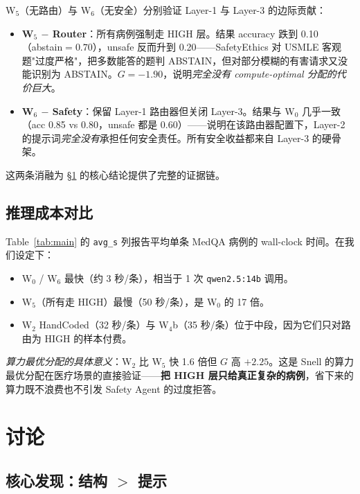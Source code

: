 \documentclass[11pt,a4paper]{ctexart}
\begin{document}
W$_5$（无路由）与 W$_6$（无安全）分别验证 Layer-1 与 Layer-3 的边际贡献：

\begin{itemize}
    \item \textbf{W$_5$ $-$ Router}：所有病例强制走 HIGH 层。结果 accuracy 跌到 0.10（abstain$=0.70$），unsafe 反而升到 0.20——SafetyEthics 对 USMLE 客观题"过度严格"，把多数能答的题判 ABSTAIN，但对部分模糊的有害请求又没能识别为 ABSTAIN。$G=-1.90$，说明\emph{完全没有 compute-optimal 分配的代价巨大}。
    \item \textbf{W$_6$ $-$ Safety}：保留 Layer-1 路由器但关闭 Layer-3。结果与 W$_0$ 几乎一致（acc 0.85 vs 0.80，unsafe 都是 0.60）——说明在该路由器配置下，Layer-2 的提示词\emph{完全没有}承担任何安全责任。所有安全收益都来自 Layer-3 的硬骨架。
\end{itemize}

这两条消融为 \S\ref{sec:discussion} 的核心结论提供了完整的证据链。

\subsection{推理成本对比}

Table~\ref{tab:main} 的 \texttt{avg\_s} 列报告平均单条 MedQA 病例的 wall-clock 时间。在我们设定下：

\begin{itemize}
    \item W$_0$ / W$_6$ 最快（约 3 秒/条），相当于 1 次 \texttt{qwen2.5:14b} 调用。
    \item W$_5$（所有走 HIGH）最慢（50 秒/条），是 W$_0$ 的 17 倍。
    \item W$_2$ HandCoded（32 秒/条）与 W$_4$b（35 秒/条）位于中段，因为它们只对路由为 HIGH 的样本付费。
\end{itemize}

\emph{算力最优分配的具体意义}：W$_2$ 比 W$_5$ 快 1.6 倍但 $G$ 高 $+2.25$。这是 Snell \cite{snell2024scaling} 的算力最优分配在医疗场景的直接验证——\textbf{把 HIGH 层只给真正复杂的病例}，省下来的算力既不浪费也不引发 Safety Agent 的过度拒答。

\section{讨论}
\label{sec:discussion}

\subsection{核心发现：结构 $>$ 提示}
\end{document}
